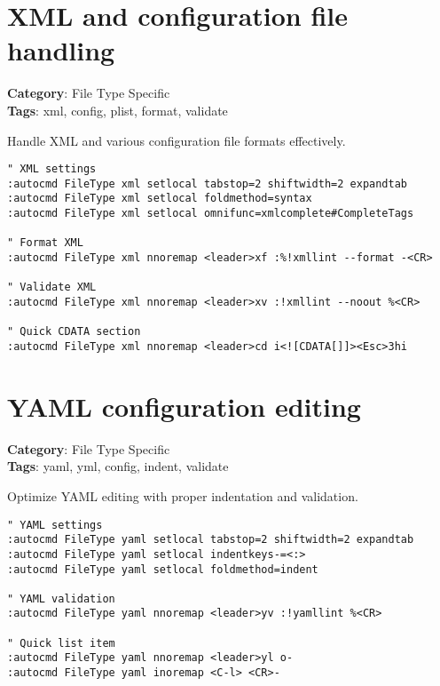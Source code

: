 {{{{{\section{XML and configuration file handling}

\textbf{Category}: File Type Specific\\ \textbf{Tags}: xml, config, plist, format, validate
\vspace{0.5cm}

Handle XML and various configuration file formats effectively.

\begin{Exa*}{}
\begin{Verbatim}[fontsize=\footnotesize, breaklines, breakanywhere]
" XML settings
:autocmd FileType xml setlocal tabstop=2 shiftwidth=2 expandtab
:autocmd FileType xml setlocal foldmethod=syntax
:autocmd FileType xml setlocal omnifunc=xmlcomplete#CompleteTags

" Format XML
:autocmd FileType xml nnoremap <leader>xf :%!xmllint --format -<CR>

" Validate XML
:autocmd FileType xml nnoremap <leader>xv :!xmllint --noout %<CR>

" Quick CDATA section
:autocmd FileType xml nnoremap <leader>cd i<![CDATA[]]><Esc>3hi
\end{Verbatim}
\end{Exa*}

\section{YAML configuration editing}

\textbf{Category}: File Type Specific\\ \textbf{Tags}: yaml, yml, config, indent, validate
\vspace{0.5cm}

Optimize YAML editing with proper indentation and validation.

\begin{Exa*}{}
\begin{Verbatim}[fontsize=\footnotesize, breaklines, breakanywhere]
" YAML settings
:autocmd FileType yaml setlocal tabstop=2 shiftwidth=2 expandtab
:autocmd FileType yaml setlocal indentkeys-=<:>
:autocmd FileType yaml setlocal foldmethod=indent

" YAML validation
:autocmd FileType yaml nnoremap <leader>yv :!yamllint %<CR>

" Quick list item
:autocmd FileType yaml nnoremap <leader>yl o- 
:autocmd FileType yaml inoremap <C-l> <CR>- 
\end{Verbatim}
\end{Exa*}

}}}}}
